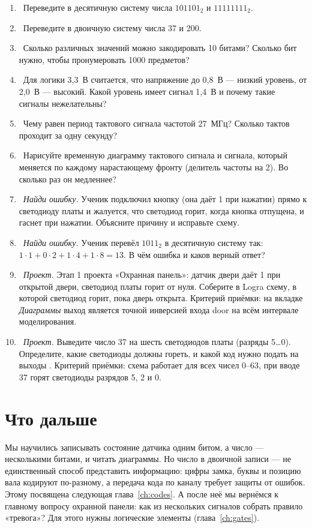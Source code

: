 \begin{taskbox}
\begin{enumerate}
  \item {}~Переведите в десятичную систему числа $101101_2$ и $11111111_2$.
  \item {}~Переведите в двоичную систему числа 37 и 200.
  \item {}~Сколько различных значений можно закодировать 10 битами? Сколько бит нужно, чтобы пронумеровать 1000 предметов?
  \item {}~Для логики 3,3~В считается, что напряжение до 0,8~В --- низкий уровень, от 2,0~В --- высокий. Какой уровень имеет сигнал 1,4~В и почему такие сигналы нежелательны?
  \item {}~Чему равен период тактового сигнала частотой 27~МГц? Сколько тактов проходит за одну секунду?
  \item {}~Нарисуйте временную диаграмму тактового сигнала и сигнала, который меняется по каждому нарастающему фронту (делитель частоты на 2). Во сколько раз он медленнее?
  \item {}~\emph{Найди ошибку.} Ученик подключил кнопку (она даёт 1 при нажатии) прямо к светодиоду платы и жалуется, что светодиод горит, когда кнопка отпущена, и гаснет при нажатии. Объясните причину и исправьте схему.
  \item {}~\emph{Найди ошибку.} Ученик перевёл $1011_2$ в десятичную систему так: $1\cdot1+0\cdot2+1\cdot4+1\cdot8=13$. В чём ошибка и каков верный ответ?
  \item {}~\emph{Проект.} Этап 1 проекта «Охранная панель»: датчик двери даёт 1 при открытой двери, светодиод платы горит от нуля. Соберите в Logra схему, в которой светодиод горит, пока дверь открыта. Критерий приёмки: на вкладке \emph{Диаграммы} выход  является точной инверсией входа door на всём интервале моделирования.
  \item {}~\emph{Проект.} Выведите число 37 на шесть светодиодов платы (разряды 5\ldots 0). Определите, какие светодиоды должны гореть, и какой код нужно подать на выходы . Критерий приёмки: схема работает для всех чисел 0--63, при вводе 37 горят светодиоды разрядов 5, 2 и 0.
\end{enumerate}
\end{taskbox}

\section{Что дальше}

Мы научились записывать состояние датчика одним битом, а число --- несколькими
битами, и читать диаграммы. Но число в двоичной записи --- не единственный
способ представить информацию: цифры замка, буквы и позицию вала кодируют по-разному,
а передача кода по каналу требует защиты от ошибок. Этому посвящена следующая
глава~\ref{ch:codes}. А после неё мы вернёмся к главному вопросу охранной
панели: как из нескольких сигналов собрать правило «тревога»? Для этого нужны
логические элементы (глава~\ref{ch:gates}).
